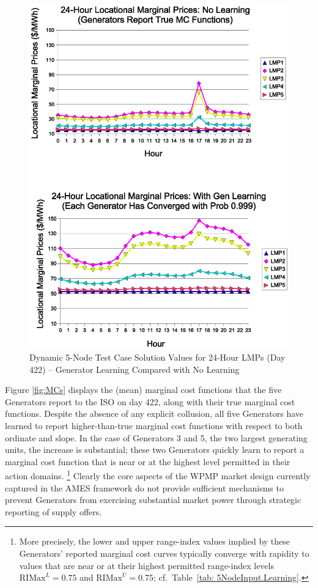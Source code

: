 \documentclass[12pt]{article}
\begin{document}
\begin{figure}
	\centering
		\includegraphics[totalheight = 20cm]{AMES.Results.LMPs.eps}
	\caption{Dynamic 5-Node Test Case Solution Values for 24-Hour LMPs (Day 422) -- Generator Learning Compared with No Learning}
	\label{fig:LMPs}
\end{figure} 
 
Figure \ref{fig:MCs} displays the (mean) marginal cost functions that the five Generators report to the ISO on day 422, along with their true marginal cost functions.  Despite the absence of any explicit collusion, all five Generators have learned to report higher-than-true marginal cost functions with respect to both ordinate and slope.  In the case of Generators 3 and 5, the two largest generating units, the increase is substantial; these two Generators quickly learn to report a marginal cost function that is near or at the highest level permitted in their action domains.%
         \footnote{More precisely, the lower and upper range-index values implied by these Generators' reported marginal cost curves typically converge with rapidity to values that are near or at their highest permitted range-index
levels $\mbox{RIMax}^L=0.75$ and $\mbox{RIMax}^U = 0.75$; cf.~Table~\ref{tab: 5NodeInput.Learning}.} 
  Clearly the core aspects of the WPMP market design currently captured in the AMES framework do not provide sufficient mechanisms to prevent Generators from exercising substantial market power through strategic reporting of supply offers. 
\end{document}
